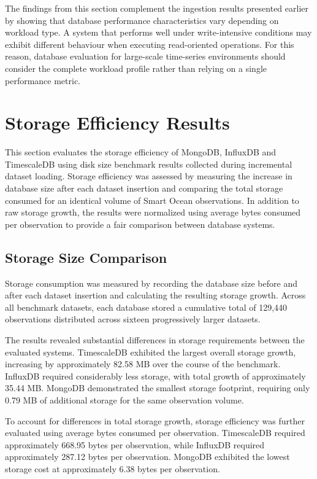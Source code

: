 The findings from this section complement the ingestion results presented earlier by showing that database performance characteristics vary depending on workload type. A system that performs well under write-intensive conditions may exhibit different behaviour when executing read-oriented operations. For this reason, database evaluation for large-scale time-series environments should consider the complete workload profile rather than relying on a single performance metric.



\section{Storage Efficiency Results}
This section evaluates the storage efficiency of MongoDB, InfluxDB and TimescaleDB using disk size benchmark results collected during incremental dataset loading. Storage efficiency was assessed by measuring the increase in database size after each dataset insertion and comparing the total storage consumed for an identical volume of Smart Ocean observations. In addition to raw storage growth, the results were normalized using average bytes consumed per observation to provide a fair comparison between database systems.

\subsection{Storage Size Comparison}
Storage consumption was measured by recording the database size before and after each dataset insertion and calculating the resulting storage growth. Across all benchmark datasets, each database stored a cumulative total of 129,440 observations distributed across sixteen progressively larger datasets.

The results revealed substantial differences in storage requirements between the evaluated systems. TimescaleDB exhibited the largest overall storage growth, increasing by approximately 82.58 MB over the course of the benchmark. InfluxDB required considerably less storage, with total growth of approximately 35.44 MB. MongoDB demonstrated the smallest storage footprint, requiring only 0.79 MB of additional storage for the same observation volume.


To account for differences in total storage growth, storage efficiency was further evaluated using average bytes consumed per observation. TimescaleDB required approximately 668.95 bytes per observation, while InfluxDB required approximately 287.12 bytes per observation. MongoDB exhibited the lowest storage cost at approximately 6.38 bytes per observation.

